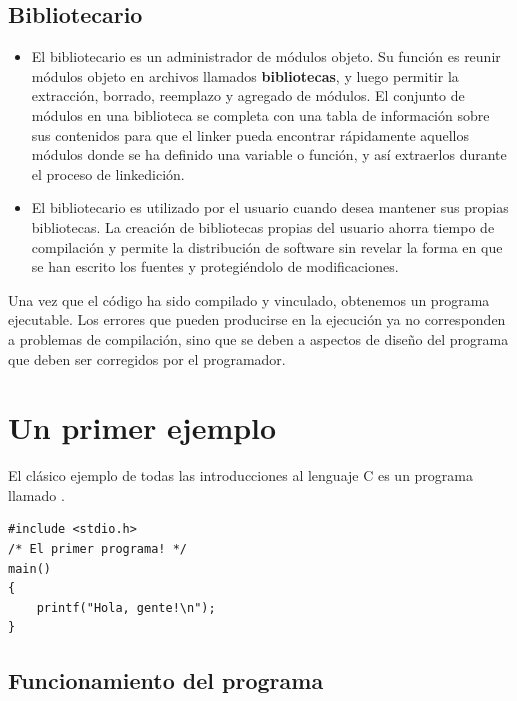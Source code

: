 \subsection{Bibliotecario}
\begin{itemize}
	\item El bibliotecario es un administrador de módulos objeto. Su función
es reunir módulos objeto en archivos llamados \textbf{bibliotecas}, y luego
permitir la extracción, borrado, reemplazo y agregado de módulos.
El conjunto de módulos en una biblioteca se completa con una tabla de
información sobre sus contenidos para que el linker pueda encontrar
rápidamente aquellos módulos donde se ha definido una variable o
función, y así extraerlos durante el proceso de linkedición. 
\item El bibliotecario es utilizado por el usuario cuando desea mantener sus
propias bibliotecas. La creación de bibliotecas propias del usuario
ahorra tiempo de compilación y permite la distribución de software
sin revelar la forma en que se han escrito los fuentes y
protegiéndolo de modificaciones. 
\end{itemize}

Una vez que el código ha sido compilado y vinculado, obtenemos un programa ejecutable. Los errores que pueden producirse en la ejecución ya no corresponden a problemas de compilación, sino que se deben a aspectos de diseño del programa que deben ser corregidos por el programador.

\section{Un primer ejemplo}

El clásico ejemplo de todas las introducciones al lenguaje C es un programa llamado .

\begin{lstlisting}
#include <stdio.h>
/* El primer programa! */
main()
{
	printf("Hola, gente!\n");
}
\end{lstlisting}

\subsection{Funcionamiento del programa}


